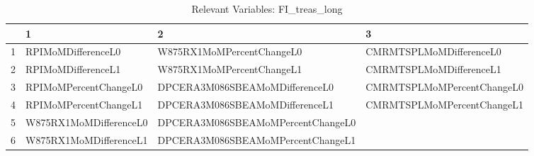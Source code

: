 \begin{longtable}{rlll}
\caption{Relevant Variables: FI_treas_long} \\ 
  \hline
 & 1 & 2 & 3 \\ 
  \hline
1 & RPIMoMDifferenceL0 & W875RX1MoMPercentChangeL0 & CMRMTSPLMoMDifferenceL0 \\ 
  2 & RPIMoMDifferenceL1 & W875RX1MoMPercentChangeL1 & CMRMTSPLMoMDifferenceL1 \\ 
  3 & RPIMoMPercentChangeL0 & DPCERA3M086SBEAMoMDifferenceL0 & CMRMTSPLMoMPercentChangeL0 \\ 
  4 & RPIMoMPercentChangeL1 & DPCERA3M086SBEAMoMDifferenceL1 & CMRMTSPLMoMPercentChangeL1 \\ 
  5 & W875RX1MoMDifferenceL0 & DPCERA3M086SBEAMoMPercentChangeL0 &  \\ 
  6 & W875RX1MoMDifferenceL1 & DPCERA3M086SBEAMoMPercentChangeL1 &  \\ 
   \hline
\hline
\end{longtable}
